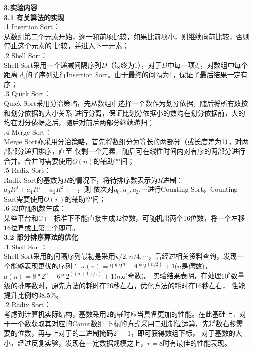 \documentclass[a4paper]{article}
\begin{document}
\begin{enumerate}
  \textbf{3.实验内容}\\
  \textbf{3.1 有关算法的实现}\\
  .1 Insertion Sort：\\
  从数组第二个元素开始，逐一和前项比较，如果比前项小，则继续向前比较，否则停止这个元素的
  比较，并进入下一元素；\\
  .2 Shell Sort：\\
  Shell Sort采用一个递减间隔序列$D$（最终为1），对于$D$中每一项$d_i$，对数组中每个距离
  $d_i$的子序列进行Insertion Sort。由于最终的间隔为1，保证了最后结果一定有序；\\
  .3 Quick Sort：\\
  Quick Sort采用分治策略，先从数组中选择一个数作为划分依据，随后将所有数按和划分依据的大小关系
  进行分离，保证比划分依据小的数均在划分依据前，大的均在划分依据之后，随后对前后两部分继续递归；\\
  .4 Merge Sort：\\
  Merge Sort亦采用分治策略，首先将数组分为等长的两部分（或长度差为1），对两部部分递归排序，直至
  仅剩一个元素，随后可在线性时间内对有序的两部分进行合并。合并时需要使用$O(n)$的辅助空间；\\
  .5 Radix Sort：\\
  Radix Sort的基数为$R$的情况下，将待排序数表示为$R$进制：$a_0R^0+a_1R^1+a_2R^2+\cdots$，则
  依次对$a_0,a_1,a_2,\cdots$进行Counting Sort。Counting Sort需要使用$O(n)$的辅助空间；\\
  .6 32位随机数生成：\\
  某些平台和C++标准下不能直接生成32位数，可随机出两个16位数，将一个左移16位异或上第二个即可。\\
  \medskip
  \textbf{3.2 部分排序算法的优化}\\
  .1 Shell Sort：\\
  Shell Sort采用的间隔序列最初是采用$n/2,n/4,\cdots$，后经过相关资料查询，发现一个能够表现更优的序列：
  $a(n) = 9*2^n - 9*2^(n/2) + 1$($n$是偶数)，$a(n) = 8*2^n - 6*2^((n+1)/2) + 1$($n$是奇数)。
  实验结果表明，在处理$10^8$数量级的排序数时，原先方法的耗时在26秒左右，优化方法的耗时在16秒左右，
  性能提升比例约38.5\%。\\
  .2 Radix Sort：\\
  考虑到计算机实际结构，基数采用2的幂时应当具备更加的性能。在此基础上，对于一个数获取其对应的Count数组
  下标的方式采用二进制位运算，先将数右移需要的位数，再与上对于的二进制掩码$2^r-1$，即可获得数组下标。
  对于基数的大小，经过反复实验，发现在一定数据规模之上，$r=8$时有最佳的性能表现。\\

\end{enumerate}
\end{document}
